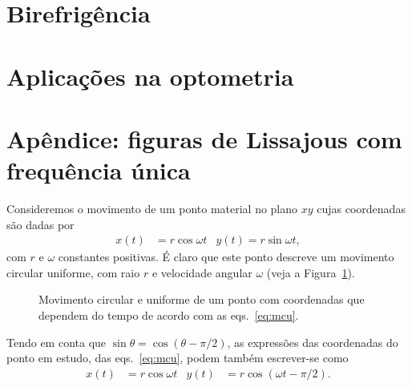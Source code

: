 \section{Birefrigência}
\tobedone{}
\section{Aplicações na optometria}
\tobedone{}

\section{Apêndice: figuras de Lissajous com frequência única}
\label{sec:lissajous}
Consideremos o movimento de um ponto material no plano $xy$ cujas coordenadas
são dadas por 
\begin{align}\label{eq:mcu}
x(t)&=r\cos\omega t&y(t)=r\sin\omega t,
\end{align}
com $r$ e $\omega$ constantes positivas. É claro que este ponto descreve um
movimento circular uniforme, com raio $r$ e velocidade angular $\omega$ (veja a
Figura~\ref{fig:mcu}).
\begin{figure}[htb]
{\centering
{}\par
}
\caption{Movimento circular e uniforme de um ponto com coordenadas que dependem
do tempo de acordo com as eqs.~\eqref{eq:mcu}.\label{fig:mcu}}
\end{figure}
Tendo em conta que $\sin\theta=\cos(\theta-\pi/2)$, as expressões das
coordenadas do ponto em estudo, das eqs.~\eqref{eq:mcu}, podem também
escrever-se como
\begin{align}
x(t)&=r\cos\omega t& y(t)&=r\cos(\omega t-\pi/2).
\end{align}

